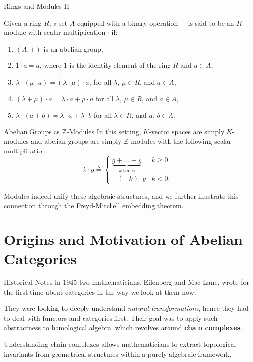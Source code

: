 \documentclass{beamer}
\newcommand{\ZZ}{\mathbb{Z}}
\begin{document}
\begin{frame}{Rings and Modules II}
    \begin{definition}[$R$-module]
        Given a ring $R$, a set $A$ equipped with a binary operation $+$ is said to be an $R$-module with
        scalar multiplication $\cdot$ if:
        \begin{enumerate}
            \item $(A, +)$ is an abelian group,
            \item $1 \cdot a = a$, where $1$ is the identity element of the ring $R$ and $a \in A$,
            \item $\lambda \cdot (\mu \cdot a) = (\lambda \cdot \mu) \cdot a$, for all $\lambda$, $\mu \in R$, and $a \in A$, 
            \item $(\lambda + \mu) \cdot a = \lambda \cdot a + \mu \cdot a$ for all $\lambda$, $\mu \in R$, and $a \in A$,
            \item $\lambda \cdot (a + b) = \lambda \cdot a + \lambda \cdot b$ for all $\lambda \in R$, and $a$, $b \in A$.
        \end{enumerate}
    \end{definition}
\end{frame}

\begin{frame}{Abelian Groups as \texorpdfstring{$\ZZ$}{ℤ}-Modules}
    In this setting, $K$-vector spaces are simply $K$-modules and abelian groups
    are simply $\ZZ$-modules with the following scalar multiplication:
    \[
        k \cdot g \triangleq \begin{cases}
            \underbrace{g + \ldots + g}_{k \text{ times}} & k \geq 0 \\
            -(-k) \cdot g & k < 0.
        \end{cases}
    \] \smallskip

    Modules indeed unify these algebraic structures, and we further illustrate this
    connection through the Freyd-Mitchell embedding theorem.
\end{frame}


\section{Origins and Motivation of Abelian Categories}

\begin{frame}{Historical Notes}
    In 1945 two mathematicians, Eilenberg and Mac Lane, wrote for the
    first time about categories in the way we look at them now. \medskip
    
    They were looking to
    deeply understand \textit{natural transformations}, hence they had
    to deal with functors and categories first. Their goal was to
    apply such abstractness to homological algebra, which revolves
    around \textbf{chain complexes}. \medskip

    Understanding chain complexes allows mathematicians to extract
    topological invariants from geometrical structures within a purely
    algebraic framework.
\end{frame}
\end{document}
